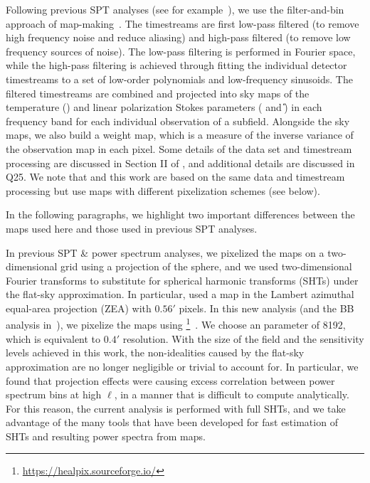 Following previous SPT analyses (see for example~\citep{dutcher21}), we use the filter-and-bin approach of map-making~\citep{hivon02}. 
The timestreams are first low-pass filtered 
(to remove high frequency noise and reduce aliasing) and high-pass filtered 
(to remove low frequency sources of noise).
The low-pass filtering is performed in Fourier space, while the high-pass filtering is achieved through fitting the individual detector timestreams to a set of low-order polynomials and low-frequency sinusoids.
The filtered timestreams are combined and projected into sky maps of the temperature (\T{}) and linear polarization Stokes parameters (\Q{} and \U{}) in each frequency band for each individual observation of a \mainfield{} subfield.
Alongside the sky maps, we also build a weight map, which is a measure of the inverse variance of the observation map in each pixel. 
Some details of the data set and timestream processing are discussed in Section II of \citep{ge24}, and additional details are discussed in Q25. 
We note that \citep{ge24} and this work are based on the same data and timestream processing but use maps with different pixelization schemes (see below).

In the following paragraphs, we highlight two important differences between the maps used here and those used in previous SPT analyses.

In previous SPT \T\&\E{} power spectrum analyses, we pixelized the maps on a two-dimensional grid using a projection of the sphere, and we used two-dimensional Fourier transforms to substitute for spherical harmonic transforms (SHTs) under the flat-sky approximation. 
In particular, \citep{ge24} used a map in the 
Lambert azimuthal equal-area projection (ZEA) with $0.56'$ pixels.
In this new analysis (and the BB analysis in~\citep{zebrowski25}), we pixelize the maps using \healpix{}\footnote{\url{https://healpix.sourceforge.io/}}~\citep{gorski05}. 
We choose an \Nside{} parameter of 8192, which is equivalent to $0.4'$ resolution. 
With the size of the \mainfield field and the sensitivity levels achieved in this work, the non-idealities caused by the flat-sky approximation are no longer negligible or trivial to account for. 
In particular, we found that projection effects were causing excess correlation between power spectrum bins at high $\ell$, in a manner that is difficult to compute analytically. 
For this reason, the current analysis is performed with full SHTs, and we take advantage of the many tools that have been developed for fast estimation of SHTs and resulting power spectra from \healpix{} maps.


